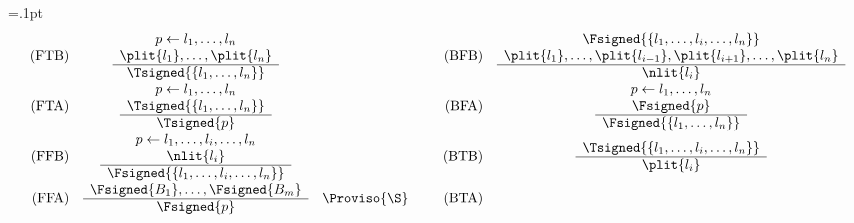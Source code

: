 {\arrayrulewidth=.1pt
\scriptsize
\[
\quad
\begin{array}{rclp{5pt}rcl}
  \text{(FTB)}
  &
  \begin{array}{c}
    p \leftarrow l_1, \dots, l_n
    \\
    \plit{l_1},\dots,\plit{l_n}
    \\\hline
    \Tsigned{\{l_1, \dots, l_n\}}
  \end{array}
  &
  &&
  \text{(BFB)}
  &
  \begin{array}{c}
    \Fsigned{\{l_1, \dots, l_i, \dots, l_n\}}
    \\
    \plit{l_1},\dots,\plit{l_{i-1}}
    ,
    \plit{l_{i+1}},\dots,\plit{l_n}
    \\\hline
    \nlit{l_i}
  \end{array}
  &
  \\[12pt]
  \text{(FTA)}
  &
  \begin{array}{c}
    p \leftarrow l_1, \dots, l_n
    \\
    \Tsigned{\{l_1, \dots, l_n\}}
    \\\hline
    \Tsigned{p}
  \end{array}
  &
  &&
  \text{(BFA)}
  &
  \begin{array}{c}
    p \leftarrow l_1, \dots, l_n
    \\
    \Fsigned{p}
    \\\hline
    \Fsigned{\{l_1, \dots, l_n\}}
  \end{array}
  &
  \\[12pt]
  \text{(FFB)}
  &
  \begin{array}{c}
    p \leftarrow l_1, \dots, l_i, \dots, l_n
    \\
    \nlit{l_i}
    \\\hline
    \Fsigned{\{l_1, \dots, l_i, \dots, l_n\}}
  \end{array}
  &
  &&
  \text{(BTB)}
  &
  \begin{array}{c}
    \Tsigned{\{l_1, \dots, l_i, \dots, l_n\}}
    \\\hline
    \plit{l_i}
  \end{array}
  &
  \\[12pt]
  \text{(FFA)}
  &
  \begin{array}{c}
    \Fsigned{B_1},\dots,\Fsigned{B_m}
    \\\hline
    \Fsigned{p}
  \end{array}
  & \Proviso{\S}
  &&
  \text{(BTA)}
  &
  \begin{array}{c}

\end{array}
\end{array}\]}
